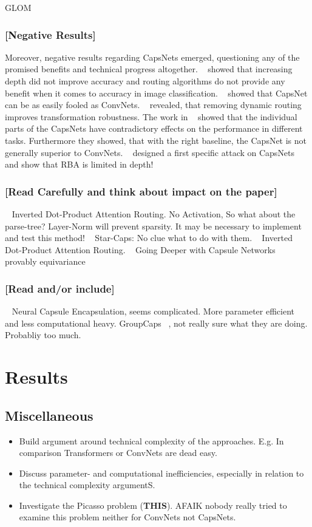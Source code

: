 \documentclass{article}
\begin{document}
GLOM ~\cite{corr/Hinton2021}

\subsubsection*{[Negative Results]}
Moreover, negative results regarding CapsNets emerged, questioning any of the promised benefits and technical progress altogether.
~\cite{acml/PaikKK19} showed that increasing depth did not improve accuracy and routing algorithms do not provide any benefit when it comes to accuracy in image classification.
~\cite{corr/michels2019} showed that CapsNet can be as easily fooled as ConvNets.
~\cite{ieee/Gu2020} revealed, that removing dynamic routing improves transformation robustness.
The work in ~\cite{cvpr/GuT021} showed that the individual parts of the CapsNets have contradictory effects on the performance in different tasks. Furthermore they showed, that with the right baseline, the CapsNet is not generally superior to ConvNets.
~\cite{iclr/Gu2021} designed a first specific attack on CapsNets and
\cite{prl/PeerSR21} show that RBA is limited in depth!


\subsubsection*{[Read Carefully and think about impact on the paper]}
~\cite{iclr/TsaiSGS20} Inverted Dot-Product Attention Routing. No Activation, So what about the parse-tree? Layer-Norm will prevent sparsity. It may be necessary to implement and test this method!
~\cite{nips/AhmedT19} Star-Caps: No clue what to do with them.
~\cite{iclr/TsaiSGS20} Inverted Dot-Product Attention Routing.
~\cite{cvpr/RajasegaranJJJS19} Going Deeper with Capsule Networks
~\cite{nips/LenssenFL18} provably equivariance

\subsubsection*{[Read and/or include]}
~\cite{eccv/LiGDOW18} Neural Capsule Encapsulation, seems complicated. More parameter efficient and less computational heavy.
GroupCaps ~\cite{cvpr/ChenJSWS18}, not really sure what they are doing. Probabliy too much.

\section{Results}
\subsection{Miscellaneous}
\begin{itemize}
	\item Build argument around technical complexity of the approaches. E.g. In comparison Transformers or ConvNets are dead easy.
	\item Discuss parameter- and computational inefficiencies, especially in relation to the technical complexity argumentS.
	\item Investigate the Picasso problem (\textbf{THIS}). AFAIK nobody really tried to examine this problem neither for ConvNets not CapsNets.
\end{itemize}
\end{document}
